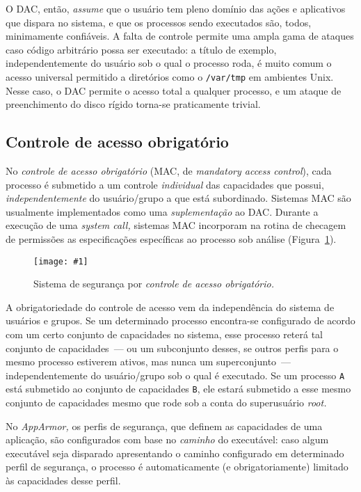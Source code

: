 \documentclass[ruledheader, 12pt]{abnt}
\newcommand{\figcustom}[4]{\par
	\begin{figure}[#3]
		\centering
		\texttt{[image: \#1]}
		\caption{\label{fig:#1}#2}
	\end{figure}
\par}
\newcommand{\figref}[1]{(Figura~\ref{fig:#1})}
\begin{document}
O DAC, então, \emph{assume} que o usuário tem pleno domínio das ações e aplicativos que dispara no sistema, e que os processos sendo executados são, todos, minimamente confiáveis. A falta de controle permite uma ampla gama de ataques caso código arbitrário possa ser executado: a título de exemplo, independentemente do usuário sob o qual o processo roda, é muito comum o acesso universal permitido a diretórios como o \verb|/var/tmp| em ambientes Unix. Nesse caso, o DAC permite o acesso total a qualquer processo, e um ataque de preenchimento do disco rígido torna-se praticamente trivial.

\subsection{Controle de acesso obrigatório}


No \emph{controle de acesso obrigatório} (MAC, de \emph{mandatory access control}), cada processo é submetido a um controle \emph{individual} das capacidades que possui, \emph{independentemente} do usuário/grupo a que está subordinado. Sistemas MAC são usualmente implementados como uma \emph{suplementação} ao DAC. Durante a execução de uma \emph{system call,} sistemas MAC incorporam na rotina de checagem de permissões as especificações específicas ao processo sob análise \figref{syscalls-mac}.

\figcustom{syscalls-mac}{Sistema de segurança por \emph{controle de acesso obrigatório.}}{bp}{.8}

A obrigatoriedade do controle de acesso vem da independência do sistema de usuários e grupos. Se um determinado processo encontra-se configurado de acordo com um certo conjunto de capacidades no sistema, esse processo reterá tal conjunto de capacidades~--- ou um subconjunto desses, se outros perfis para o mesmo processo estiverem ativos, mas nunca um superconjunto~--- independentemente do usuário/grupo sob o qual é executado. Se um processo \verb|A| está submetido ao conjunto de capacidades \verb|B|, ele estará submetido a esse mesmo conjunto de capacidades mesmo que rode sob a conta do superusuário \emph{root.}

No \emph{AppArmor,} os perfis de segurança, que definem as capacidades de uma aplicação, são configurados com base no \emph{caminho} do executável: caso algum executável seja disparado apresentando o caminho configurado em determinado perfil de segurança, o processo é automaticamente (e obrigatoriamente) limitado às capacidades desse perfil.
\end{document}
